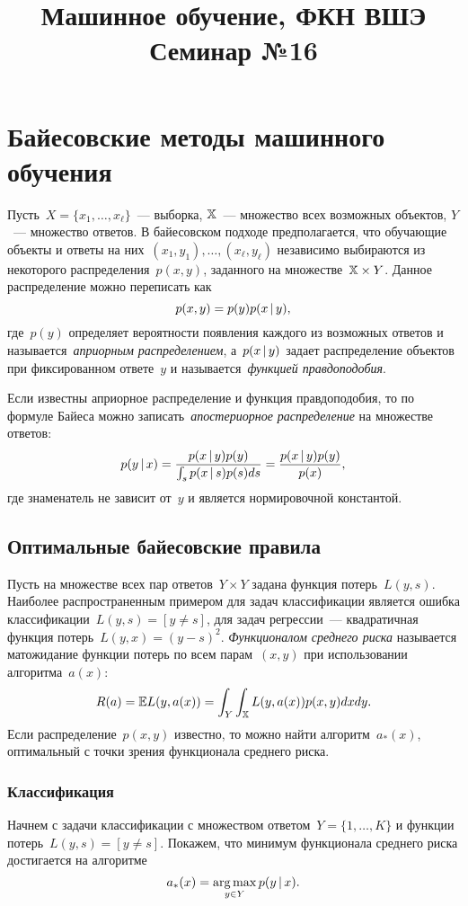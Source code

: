 \documentclass[12pt,fleqn]{article}
\title{Машинное обучение, ФКН ВШЭ\\Семинар №16}
\author{}
\date{}
\begin{document}
	\maketitle

\section{Байесовские методы машинного обучения}
Пусть~$X = \{x_1, \dots, x_\ell\}$~--- выборка,
$\mathbb{X}$~--- множество всех возможных объектов,
$Y$~--- множество ответов.
В байесовском подходе предполагается, что обучающие
объекты и ответы на них~$(x_1, y_1), \dots, (x_\ell, y_\ell)$ независимо выбираются
из некоторого распределения~$p(x, y)$, заданного на множестве~$\XX \times Y$.
Данное распределение можно переписать как
\[
    p(x, y)
    =
    p(y) p(x \mspace{3mu}{|}\mspace{3mu} y),
\]
где~$p(y)$ определяет вероятности появления каждого из возможных ответов
и называется~\emph{априорным распределением},
а~$p(x \mspace{3mu}{|}\mspace{3mu} y)$ задает распределение объектов при фиксированном ответе~$y$
и называется~\emph{функцией правдоподобия}.

Если известны априорное распределение и функция правдоподобия,
то по формуле Байеса можно записать~\emph{апостериорное распределение}
на множестве ответов:
\[
    p(y \mspace{3mu}{|}\mspace{3mu} x)
    =
    \frac{
        p(x \mspace{3mu}{|}\mspace{3mu} y) p(y)
    }{
        \int_s p(x \mspace{3mu}{|}\mspace{3mu} s) p(s) ds
    }
    =
    \frac{
        p(x \mspace{3mu}{|}\mspace{3mu} y) p(y)
    }{
        p(x)
    },
\]
где знаменатель не зависит от~$y$ и является нормировочной константой.

\subsection{Оптимальные байесовские правила}
Пусть на множестве всех пар ответов~$Y \times Y$ задана функция
потерь~$L(y, s)$.
Наиболее распространенным примером для задач классификации
является ошибка классификации~$L(y, s) = [y \neq s]$,
для задач регрессии~--- квадратичная функция потерь~$L(y, x) = (y - s)^2$.
\emph{Функционалом среднего риска} называется матожидание функции потерь
по всем парам~$(x, y)$ при использовании алгоритма~$a(x)$:
\[
    R(a) = \mathbb{E} L(y, a(x))
    =
    \int_{Y} \int_{\mathbb{X}} L(y, a(x)) p(x, y) dx dy.
\]
Если распределение~$p(x, y)$ известно, то можно найти алгоритм~$a_*(x)$,
оптимальный с точки зрения функционала среднего риска.

\subsubsection{Классификация}
Начнем с задачи классификации с множеством ответом~$Y = \{1, \dots, K\}$
и функции потерь~$L(y, s) = [y \neq s]$.
Покажем, что минимум функционала среднего риска достигается
на алгоритме
\[
    a_*(x) = \mathop{\rm arg\,max}\limits_{y \in Y} p(y \mspace{3mu}{|}\mspace{3mu} x).
\]
\end{document}
